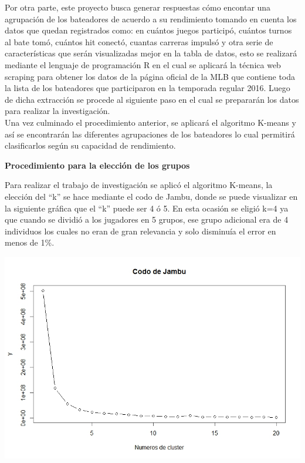 \documentclass[11pt,letterpaper]{report}
\begin{document}
    Por otra parte, este proyecto busca generar respuestas c\'omo encontar una agrupaci\'on de los bateadores de acuerdo a su rendimiento tomando en cuenta los datos que quedan registrados como: en cu\'antos juegos particip\'o, cu\'antos turnos al bate tom\'o, cu\'antos hit conect\'o, cuantas carreras impuls\'o y otra serie de caracter\'isticas que ser\'an visualizadas mejor en la tabla de datos, esto se realizar\'a mediante el lenguaje de programaci\'on R en el cual se aplicar\'a la t\'ecnica web scraping para obtener los datos de la p\'agina oficial de la MLB que contiene toda la lista de los bateadores que participaron en la temporada regular 2016. Luego de dicha extracci\'on se procede al siguiente paso en el cual se preparar\'an los datos para realizar la investigaci\'on.\\
    
    Una vez culminado el procedimiento anterior, se aplicar\'a el algoritmo K-means y as\'i se encontrar\'an las diferentes agrupaciones de los bateadores lo cual permitir\'a clasificarlos seg\'un su capacidad de rendimiento.
    
   \begin{center}
   	\textbf{\large Procedimiento para la elecci\'on de los grupos}
   \end{center}
   
   Para realizar el trabajo de investigaci\'on se aplic\'o el algoritmo K-means, la elecci\'on del “k” se hace mediante el codo de Jambu, donde se puede visualizar en la siguiente gr\'afica que el “k” puede ser 4 \'o 5. En esta ocasi\'on se eligi\'o k=4 ya que cuando se dividi\'o a los jugadores en 5 grupos, ese grupo adicional era de 4 individuos los cuales no eran de gran relevancia  y solo disminuía el error en menos de 1\%.
   
   \includegraphics[scale=0.5]{Codo.jpeg}
   
\end{document}
